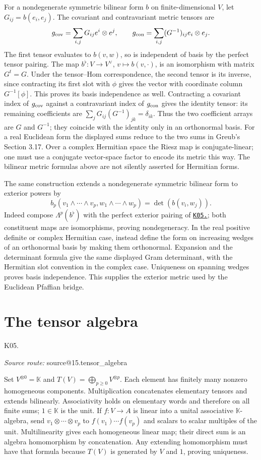 \documentclass[11pt,a4paper]{book}
\makeatletter
\theoremstyle{definition}\newtheorem{definition}[theorem]{Definition}
\theoremstyle{remark}\newtheorem{remark}[theorem]{Remark}
\newcommand{\K}{\mathbb K}\newcommand{\R}{\mathbb R}\newcommand{\C}{\mathbb C}
\newcommand{\kref}[1]{\hyperref[k:#1]{\texttt{K05.\detokenize{#1}}}}
\newcommand{\Kentry}[2]{\section{#2}\label{k:#1}\noindent\textsf{\small K05.\detokenize{#1}}\par
  \begingroup\small\color{black!65}\textit{Source route: }\csname source@#1\endcsname\par\endgroup}
\makeatother
\begin{document}
For a nondegenerate symmetric bilinear form $b$ on finite-dimensional $V$, let $G_{ij}=b(e_i,e_j)$. The covariant and contravariant metric tensors are
\[
 g_{\rm cov}=\sum_{i,j}G_{ij}e^i\otimes e^j,\qquad
 g_{\rm con}=\sum_{i,j}(G^{-1})_{ij}e_i\otimes e_j.
\]
The first tensor evaluates to $b(v,w)$, so is independent of basis by the perfect tensor pairing. The map $b^\flat:V\to V^\vee$, $v\mapsto b(v,\cdot)$, is an isomorphism with matrix $G^t=G$. Under the tensor--Hom correspondence, the second tensor is its inverse, since contracting its first slot with $\phi$ gives the vector with coordinate column $G^{-1}[\phi]$. This proves its basis independence as well. Contracting a covariant index of $g_{\rm cov}$ against a contravariant index of $g_{\rm con}$ gives the identity tensor: its remaining coefficients are $\sum_jG_{ij}(G^{-1})_{jk}=\delta_{ik}$. Thus the two coefficient arrays are $G$ and $G^{-1}$; they coincide with the identity only in an orthonormal basis. For a real Euclidean form the displayed sums reduce to the two sums in Greub's Section 3.17. Over a complex Hermitian space the Riesz map is conjugate-linear; one must use a conjugate vector-space factor to encode its metric this way. The bilinear metric formulas above are not silently asserted for Hermitian forms.

The same construction extends a nondegenerate symmetric bilinear form to exterior powers by
\[
 b_p(v_1\wedge\cdots\wedge v_p,w_1\wedge\cdots\wedge w_p)
   =\det(b(v_i,w_j)).
\]
Indeed compose $\Lambda^p(b^\flat)$ with the perfect exterior pairing of \kref{15.exterior_pairing}; both constituent maps are isomorphisms, proving nondegeneracy. In the real positive definite or complex Hermitian case, instead define the form on increasing wedges of an orthonormal basis by making them orthonormal. Expansion and the determinant formula give the same displayed Gram determinant, with the Hermitian slot convention in the complex case. Uniqueness on spanning wedges proves basis independence. This supplies the exterior metric used by the Euclidean Pfaffian bridge.

\Kentry{15.tensor_algebra}{The tensor algebra}
Set $V^{\otimes0}=\K$ and $T(V)=\bigoplus_{p\ge0}V^{\otimes p}$. Each element has finitely many nonzero homogeneous components. Multiplication concatenates elementary tensors and extends bilinearly. Associativity holds on elementary words and therefore on all finite sums; $1\in\K$ is the unit. If $f:V\to A$ is linear into a unital associative $\K$-algebra, send $v_1\otimes\cdots\otimes v_p$ to $f(v_1)\cdots f(v_p)$ and scalars to scalar multiples of the unit. Multilinearity gives each homogeneous linear map; their direct sum is an algebra homomorphism by concatenation. Any extending homomorphism must have that formula because $T(V)$ is generated by $V$ and $1$, proving uniqueness.
\end{document}

